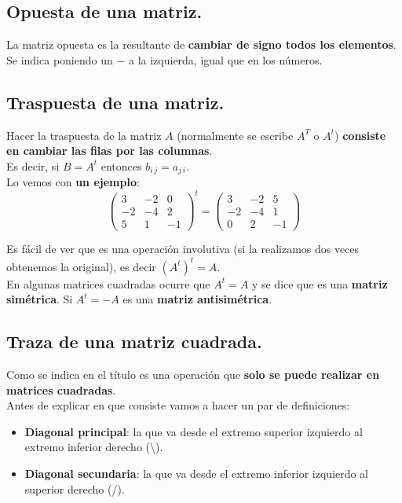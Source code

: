 \documentclass[a4paper,11pt,answers]{exam}
\begin{document}
\subsection{Opuesta de una matriz.}
La matriz opuesta es la resultante de \textbf{cambiar de signo todos los elementos}. Se indica poniendo un $-$ a la izquierda, igual que en los números.
\subsection{Traspuesta de una matriz.}
Hacer la traspuesta de la matriz $A$ (normalmente se escribe $A^T$ o $A^t$) \textbf{consiste en cambiar las filas por las columnas}.\\
Es decir, si $B = A^t$ entonces $b_{i\,j} = a_{j\,i}$.\\

Lo vemos con \textbf{un ejemplo}:
\[\left(\begin{array}{rrr}
	3&-2& 0\\
	-2&-4&2\\
	5&1&-1
\end{array} \right)^t =
\left(\begin{array}{rrr}
	3&-2& 5\\
	-2&-4&1\\
	0&2&-1
\end{array} \right)
\]

Es fácil de ver que es una operación involutiva (si la realizamos dos veces obtenemos la original), es decir $\left(A^t\right)^t = A$.\\

En algunas matrices cuadradas ocurre que $A^t = A$ y se dice que es una \textbf{matriz simétrica}. Si $A^t = -A$ es una \textbf{matriz antisimétrica}.
\subsection{Traza de una matriz cuadrada.}
Como se indica en el título es una operación que \textbf{solo se puede realizar en matrices cuadradas}.\\

Antes de explicar en que consiste vamos a hacer un par de definiciones:
\begin{itemize}
	\item \textbf{Diagonal principal}: la que va desde el extremo superior izquierdo al extremo inferior derecho (\textbackslash).
	\item \textbf{Diagonal secundaria}: la que va desde el extremo inferior izquierdo al superior derecho (/).
\end{itemize}
\end{document}
